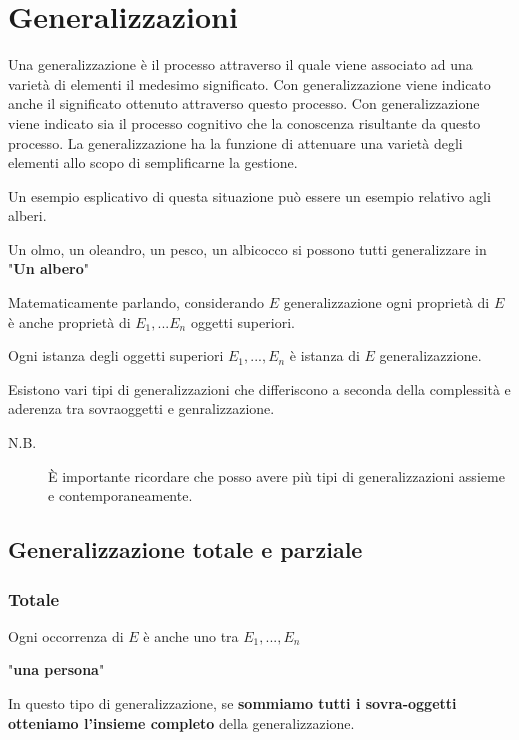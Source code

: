 \chapter{Generalizzazioni}

Una generalizzazione è il processo attraverso il quale viene associato ad una varietà di elementi il medesimo significato. Con generalizzazione viene indicato anche il significato ottenuto attraverso questo processo. Con generalizzazione viene indicato sia il processo cognitivo che la conoscenza risultante da questo processo. La generalizzazione ha la funzione di attenuare una varietà degli elementi allo scopo di semplificarne la gestione.

\begin{exmp}
Un esempio esplicativo di questa situazione può essere un esempio relativo agli alberi.

Un olmo, un oleandro, un pesco, un albicocco si possono tutti generalizzare in "\textbf{Un albero}"
\end{exmp}

Matematicamente parlando, considerando $E$ generalizzazione ogni proprietà di $E$ è anche proprietà di $E_1, ... E_n$ oggetti superiori.

Ogni istanza degli oggetti superiori $E_1, ..., E_n$ è istanza di $E$ generalizazzione.

Esistono vari tipi di generalizzazioni che differiscono a seconda della complessità e aderenza tra sovraoggetti e genralizzazione.

\begin{description}
	\item[N.B.] È importante ricordare che posso avere più tipi di generalizzazioni assieme e contemporaneamente.
\end{description}


\section{Generalizzazione totale e parziale}
\subsection{Totale}
Ogni occorrenza di $E$  è anche uno tra $E_1, ..., E_n$

\begin{exmp}
 "\textbf{una persona}"
\end{exmp}

In questo tipo di generalizzazione, se \textbf{sommiamo tutti i sovra-oggetti otteniamo l'insieme completo} della generalizzazione.

